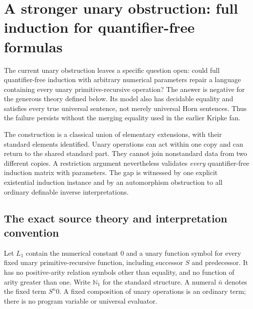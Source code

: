 \section{A stronger unary obstruction: full induction for quantifier-free formulas}
\label{sec:unary-amalgam}

The current unary obstruction leaves a specific question open: could
full quantifier-free induction with arbitrary numerical parameters repair
a language containing every unary primitive-recursive operation? The
answer is negative for the generous theory defined below. Its model
also has decidable equality and satisfies every true universal sentence,
not merely universal Horn sentences. Thus the failure persists without
the merging equality used in the earlier Kripke fan.

The construction is a classical union of elementary extensions, with
their standard elements identified. Unary operations can act within
one copy and can return to the shared standard part. They cannot join
nonstandard data from two different copies. A restriction argument
nevertheless validates \emph{every} quantifier-free induction matrix
with parameters. The gap is witnessed by one explicit existential
induction instance and by an automorphism obstruction to all ordinary
definable inverse interpretations.

\subsection{The exact source theory and interpretation convention}
\label{subsec:amalgam-source}

Let $L_1$ contain the numerical constant $0$ and a unary function symbol
for every fixed unary primitive-recursive function, including successor
$S$ and predecessor. It has no positive-arity relation symbols other
than equality, and no function of arity greater than one. Write
$\mathbb N_1$ for the standard structure. A numeral $\bar n$ denotes
the fixed term $S^n0$. A fixed composition of unary operations is an
ordinary term; there is no program variable or universal evaluator.

